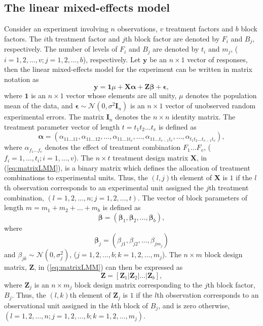 \documentclass[article]{jss}
\newcommand{\I}{\mathbf{I}}
\newcommand{\Z}{\mathbf{Z}}
\newcommand{\X}{\mathbf{X}}
\begin{document}
\subsection{The linear mixed-effects model}
\label{subsec:matrixLMM}
Consider an experiment involving $n$ observations, $v$ treatment factors and $b$ block factors. The $i$th treatment factor and $j$th block factor are denoted by $F_i$ and $B_j$, respectively. The number of levels of $F_i$ and $B_j$ are denoted by $t_i$ and $m_j$, ($i = 1,2, \dots, v; j = 1,2,\dots, b$), respectively. Let $\bm{y}$ be an $n \times 1$ vector of responses, then the linear mixed-effects model for the experiment can be written in matrix notation as
\begin{equation}\label{eq:matrixLMM}
\bm{y} = \mathbf{1}\mu + \X \bm{\alpha} + \Z\bm{\beta} + \bm{\epsilon},
\end{equation}
where $\mathbf{1}$ is an $n \times 1$ vector whose elements are all unity, $\mu$ denotes the population mean of the data, and $\bm{\epsilon}\sim \mathcal{N}(0,\sigma^2 \I_n)$ is an $n \times 1$ vector of unobserved random experimental errors. The matrix $\I_n$ denotes the $n \times n$ identity matrix. The treatment parameter vector of length $t = t_1 t_2  \dots  t_v$ is defined as 
\begin{equation}
\label{eq:treatPar}
\bm{\alpha} = (\alpha_{11 \dots 11}, \alpha_{11 \dots 12}, \dots,  \alpha_{1 1 \dots 1t_v},\dots,\alpha_{1 1 \dots t_{v-1}t_v},\dots,\alpha_{t_1 t_2 \dots t_{v-1}t_v}),
\end{equation}
where $\alpha_{f_1 \dots f_v}$ denotes the effect of treatment combination $F_1 \dots F_v$, ($f_i = 1, \dots, t_i; i = 1,\dots, v$). The $n \times t$ treatment design matrix $\X$, in (\ref{eq:matrixLMM}), is a binary matrix which defines the allocation of treatment combinations to experimental units. Thus, the $(l,j)$th element of $\X$ is $1$ if the $l$th observation corresponds to an experimental unit assigned the $j$th treatment combination, $(l=1,2,\dots,n; j=1,2,\dots, t)$. The vector of block parameters of length $m = m_1 + m_2  + \dots + m_b$ is defined as
\begin{equation}\label{eq:block1Par}
\bm{\beta} = (\bm{\beta}_1, \bm{\beta}_2, \ldots, \bm{\beta}_b), 
\end{equation} 
where
\[
\bm{\beta}_j = (\beta_{j1}, \beta_{j2}, \dots, \beta_{j m_j})
\]
and 
$\beta_{jk} \sim \mathcal{N}(0, \sigma_j^2)$, ($j=1,2,\dots,b; k=1,2,\dots, m_j$). The $n \times m$ block design matrix, $\Z$, in (\ref{eq:matrixLMM}) can then be expressed as 
\begin{equation}\label{eq:block1Mat}
\Z = [\Z_1 \vert \Z_2 \vert \ldots \vert \Z_b],
\end{equation}
where $\Z_j$ is an $n \times m_j$ block design matrix corresponding to the $j$th block factor, $B_j$. Thus, the $(l,k)$th element of $\Z_j$ is $1$ if the $l$th observation corresponds to an observational unit assigned in the $k$th block of $B_j$, and is zero otherwise, $(l=1,2,\dots,n; j=1,2,\dots,b; k=1,2,\dots, m_j)$. 
\end{document}
